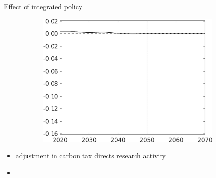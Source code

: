 \documentclass[11pt,aspectratio=169]{beamer}
\begin{document}
\begin{frame}{Effect of integrated policy }
\begin{figure}
\begin{subfigure}{0.45\textwidth}
			\includegraphics[width=1\textwidth]{../codding_model/own_basedOnFried/optimalPol_010922_revision/figures/all_13Sept22/NewCalib_polTaulFixedTaufJointPer_onlyTauf_Hagg_Sun2_emnet1_spillover0_knspil3_xgr0_nsk0_sep0_extern0_PV1_etaa0.79_lgd0.png}
		\end{subfigure}
	\end{figure}
	\vspace{3mm}
	\begin{block}{}
		\begin{itemize}
			\item adjustment in carbon tax directs research activity 
			\item[] %
		\end{itemize}
	\end{block}	
\end{frame}
\end{document}
